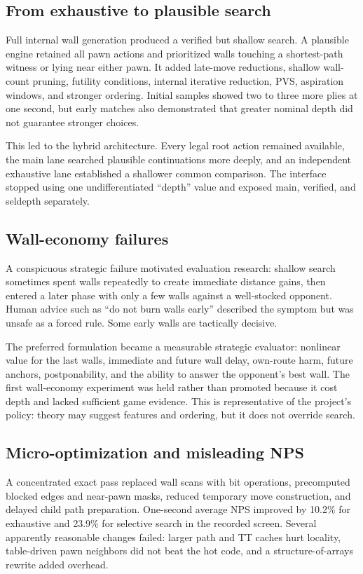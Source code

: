 \subsection{From exhaustive to plausible search}
Full internal wall generation produced a verified but shallow search. A plausible engine retained all pawn actions and prioritized walls touching a shortest-path witness or lying near either pawn. It added late-move reductions, shallow wall-count pruning, futility conditions, internal iterative reduction, PVS, aspiration windows, and stronger ordering. Initial samples showed two to three more plies at one second, but early matches also demonstrated that greater nominal depth did not guarantee stronger choices.

This led to the hybrid architecture. Every legal root action remained available, the main lane searched plausible continuations more deeply, and an independent exhaustive lane established a shallower common comparison. The interface stopped using one undifferentiated ``depth'' value and exposed main, verified, and seldepth separately.

\subsection{Wall-economy failures}
A conspicuous strategic failure motivated evaluation research: shallow search sometimes spent walls repeatedly to create immediate distance gains, then entered a later phase with only a few walls against a well-stocked opponent. Human advice such as ``do not burn walls early'' described the symptom but was unsafe as a forced rule. Some early walls are tactically decisive.

The preferred formulation became a measurable strategic evaluator: nonlinear value for the last walls, immediate and future wall delay, own-route harm, future anchors, postponability, and the ability to answer the opponent's best wall. The first wall-economy experiment was held rather than promoted because it cost depth and lacked sufficient game evidence. This is representative of the project's policy: theory may suggest features and ordering, but it does not override search.

\subsection{Micro-optimization and misleading NPS}
A concentrated exact pass replaced wall scans with bit operations, precomputed blocked edges and near-pawn masks, reduced temporary move construction, and delayed child path preparation. One-second average NPS improved by 10.2\% for exhaustive and 23.9\% for selective search in the recorded screen. Several apparently reasonable changes failed: larger path and TT caches hurt locality, table-driven pawn neighbors did not beat the hot code, and a structure-of-arrays rewrite added overhead.


